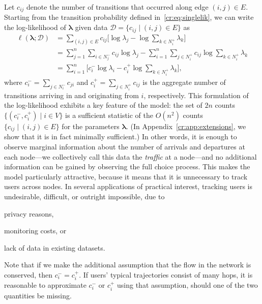 Let $c_{ij}$ denote the number of transitions that occurred along edge $(i, j) \in E$.
Starting from the transition probability defined in~\eqref{cr:eq:singlelik}, we can write the log-likelihood of $\bm{\lambda}$ given data $\mathcal{D} = \{ c_{ij} \mid (i, j) \in E \}$ as
\begin{align}
\ell(\bm{\lambda} ; \mathcal{D})
    &= \sum_{(i,j) \in E} c_{ij} \bigg[ \log \lambda_j - \log \sum_{k \in N^+_i} \lambda_k \bigg] \nonumber \\
    &= \sum_{j = 1}^n \sum_{i \in N^-_j}\!c_{ij} \log \lambda_j
       - \sum_{i = 1}^n \sum_{j \in N^+_i}\!c_{ij} \log \sum_{k \in N^+_i} \lambda_k \nonumber \\
    &= \sum_{i = 1}^n \bigg[ c^-_i \log \lambda_i - c^+_i \log \sum_{k \in N^+_i} \lambda_k \bigg], \label{cr:eq:loglik}
\end{align}
where $c^-_i = \sum_{j \in N^-_i} c_{ji}$ and $c^+_i = \sum_{j \in N^+_i} c_{ij}$ is the aggregate number of transitions arriving in and originating from $i$, respectively.
This formulation of the log-likelihood exhibits a key feature of the model:
the set of $2n$ counts $\{ (c^-_i, c^+_i) \mid i \in V \}$ is a sufficient statistic of the $O(n^2)$ counts $\{ c_{ij} \mid (i, j) \in E \}$ for the parameters $\bm{\lambda}$.
(In Appendix~\ref{cr:app:extensions}, we show that it is in fact minimally sufficient.)
In other words, it is enough to observe marginal information about the number of arrivals and departures at each node---we collectively call this data the \emph{traffic} at a node---and no additional information can be gained by observing the full choice process.
This makes the model particularly attractive, because it means that it is unnecessary to track users across nodes.
In several applications of practical interest, tracking users is undesirable, difficult, or outright impossible, due to
\begin{enuminline}
\item privacy reasons,
\item monitoring costs, or
\item lack of data in existing datasets.
\end{enuminline}

Note that if we make the additional assumption that the flow in the network is conserved, then $c^-_i = c^+_i$.
If users' typical trajectories consist of many hops, it is reasonable to approximate $c^-_i$ or $c^+_i$ using that assumption, should one of the two quantities be missing.

